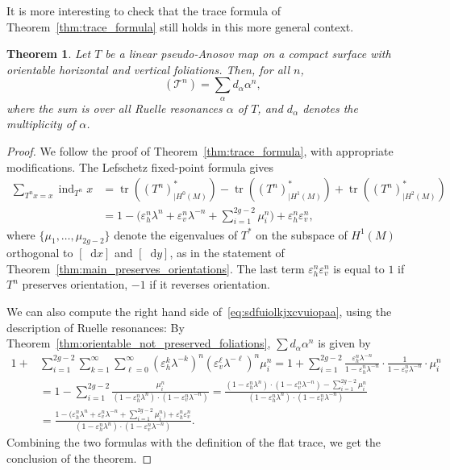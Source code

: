\documentclass[10pt]{amsart}
\newcommand{\boT}{\mathcal{T}}
\newcommand{\dd}{\mathop{}\!\mathrm{d}}
\newcommand{\pareg}[1]{\bigl(#1\bigr)}
\newcommand{\paregg}[1]{\biggl(#1\biggr)}
\newcommand{\restr}{|}
\DeclareMathOperator{\ind}{ind}
\DeclareMathOperator{\flattr}{\mathrm{tr}^{\flat}}
\DeclareMathOperator{\tr}{tr}
\let\epsilon\varepsilon
\newtheorem{thm}{Theorem}[section]
\theoremstyle{definition}
\numberwithin{equation}{section}
\begin{document}
It is more interesting to check that the trace formula of
Theorem~\ref{thm:trace_formula} still holds in this more general context.
\begin{thm}
\label{thm:trace_orientable} Let $T$ be a linear pseudo-Anosov map on a
compact surface with orientable horizontal and vertical foliations. Then, for
all $n$,
\begin{equation}
\label{eq:sdfuiolkjxcvuiopaa}
\flattr(\boT^n) = \sum_\alpha d_\alpha \alpha^n,
\end{equation}
where the sum is over all Ruelle resonances $\alpha$ of $T$, and $d_\alpha$
denotes the multiplicity of $\alpha$.
\end{thm}
\begin{proof}
We follow the proof of Theorem~\ref{thm:trace_formula}, with appropriate
modifications. The Lefschetz fixed-point formula gives
\begin{align*}
\sum_{T^n x = x} \ind_{T^n} x
&= \tr((T^n)_{\restr H^0(M)}^*) - \tr((T^n)_{\restr H^1(M)}^*) + \tr((T^n)_{\restr H^2(M)}^*)
\\[-5pt]
& = 1 - \paregg{\epsilon_h^n\lambda^n + \epsilon_v^n \lambda^{-n} + \sum_{i=1}^{2g-2} \mu_i^n} + \epsilon_h^n \epsilon_v^n,
\end{align*}
where $\{\mu_1,\dotsc, \mu_{2g-2}\}$ denote the eigenvalues of $T^*$ on the
subspace of $H^1(M)$ orthogonal to $[\dd x]$ and $[\dd y]$, as in the
statement of Theorem~\ref{thm:main_preserves_orientations}. The last term
$\epsilon_h^n \epsilon_v^n$ is equal to $1$ if $T^n$ preserves orientation,
$-1$ if it reverses orientation.

We can also compute the right hand side of~\eqref{eq:sdfuiolkjxcvuiopaa},
using the description of Ruelle resonances: By
Theorem~\ref{thm:orientable_not_preserved_foliations}, $\sum d_\alpha
\alpha^n$ is given by
\begin{align*}
 1 + &\sum_{i=1}^{2g-2} \sum_{k=1}^\infty \sum_{\ell=0}^\infty
(\epsilon_h^k \lambda^{-k})^n (\epsilon_v^\ell \lambda^{-\ell})^n \mu_i^n
= 1 + \sum_{i=1}^{2g-2} \frac{ \epsilon_h^n \lambda^{-n}}{1-\epsilon_h^n \lambda^{-n}} \cdot \frac{1}{1-\epsilon_v^n \lambda^{-n}} \cdot \mu_i^n
\\&
= 1 - \sum_{i=1}^{2g-2} \frac{\mu_i^n}{(1-\epsilon_h^n \lambda^n) \cdot (1-\epsilon_v^n \lambda^{-n})}
= \frac{(1-\epsilon_h^n \lambda^n) \cdot (1-\epsilon_v^n \lambda^{-n}) - \sum_{i=1}^{2g-2} \mu_i^n}{(1-\epsilon_h^n \lambda^n) \cdot (1-\epsilon_v^n
\lambda^{-n})}
\\&
= \frac{1 - \pareg{\epsilon_h^n \lambda^n + \epsilon_v^n \lambda^{-n} + \sum_{i=1}^{2g-2} \mu_i^n} + \epsilon_h^n \epsilon_v^n} {(1-\epsilon_h^n \lambda^n) \cdot
(1-\epsilon_v^n \lambda^{-n})}.
\end{align*}
Combining the two formulas with the definition of the flat trace, we get the
conclusion of the theorem.
\end{proof}
\end{document}
